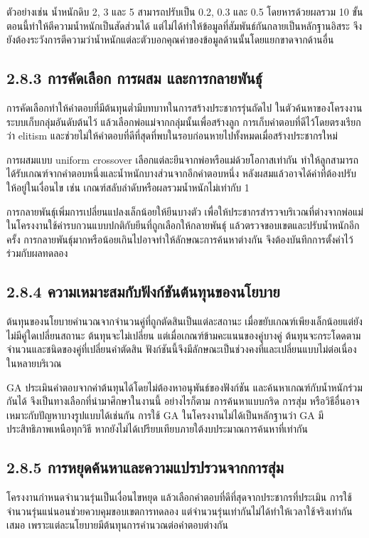 ตัวอย่างเช่น น้ำหนักดิบ 2, 3 และ 5 สามารถปรับเป็น 0.2, 0.3 และ 0.5 โดยหารด้วยผลรวม 10 ขั้นตอนนี้ทำให้ตีความน้ำหนักเป็นสัดส่วนได้ แต่ไม่ได้ทำให้ข้อมูลที่สัมพันธ์กันกลายเป็นหลักฐานอิสระ จึงยังต้องระวังการตีความว่าน้ำหนักแต่ละตัวบอกคุณค่าของข้อมูลด้านนั้นโดยแยกขาดจากด้านอื่น

\subsection*{2.8.3 การคัดเลือก การผสม และการกลายพันธุ์}
การคัดเลือกทำให้คำตอบที่มีต้นทุนต่ำมีบทบาทในการสร้างประชากรรุ่นถัดไป ในตัวค้นหาของโครงงาน ระบบเก็บกลุ่มอันดับต้นไว้ แล้วเลือกพ่อแม่จากกลุ่มนั้นเพื่อสร้างลูก การเก็บคำตอบที่ดีไว้โดยตรงเรียกว่า elitism และช่วยไม่ให้คำตอบที่ดีที่สุดที่พบในรอบก่อนหายไปทั้งหมดเมื่อสร้างประชากรใหม่

การผสมแบบ uniform crossover เลือกแต่ละยีนจากพ่อหรือแม่ด้วยโอกาสเท่ากัน ทำให้ลูกสามารถได้รับเกณฑ์จากคำตอบหนึ่งและน้ำหนักบางส่วนจากอีกคำตอบหนึ่ง หลังผสมแล้วอาจได้ค่าที่ต้องปรับให้อยู่ในเงื่อนไข เช่น เกณฑ์สลับลำดับหรือผลรวมน้ำหนักไม่เท่ากับ 1

การกลายพันธุ์เพิ่มการเปลี่ยนแปลงเล็กน้อยให้ยีนบางตัว เพื่อให้ประชากรสำรวจบริเวณที่ต่างจากพ่อแม่ ในโครงงานใช้ค่ารบกวนแบบปกติกับยีนที่ถูกเลือกให้กลายพันธุ์ แล้วตรวจขอบเขตและปรับน้ำหนักอีกครั้ง การกลายพันธุ์มากหรือน้อยเกินไปอาจทำให้ลักษณะการค้นหาต่างกัน จึงต้องบันทึกการตั้งค่าไว้ร่วมกับผลทดลอง

\subsection*{2.8.4 ความเหมาะสมกับฟังก์ชันต้นทุนของนโยบาย}
ต้นทุนของนโยบายคำนวณจากจำนวนคู่ที่ถูกตัดสินเป็นแต่ละสถานะ เมื่อขยับเกณฑ์เพียงเล็กน้อยแต่ยังไม่มีคู่ใดเปลี่ยนสถานะ ต้นทุนจะไม่เปลี่ยน แต่เมื่อเกณฑ์ข้ามคะแนนของคู่บางคู่ ต้นทุนจะกระโดดตามจำนวนและชนิดของคู่ที่เปลี่ยนคำตัดสิน ฟังก์ชันนี้จึงมีลักษณะเป็นช่วงคงที่และเปลี่ยนแบบไม่ต่อเนื่องในหลายบริเวณ

GA ประเมินคำตอบจากค่าต้นทุนได้โดยไม่ต้องหาอนุพันธ์ของฟังก์ชัน และค้นหาเกณฑ์กับน้ำหนักร่วมกันได้ จึงเป็นทางเลือกที่นำมาศึกษาในงานนี้ อย่างไรก็ตาม การค้นหาแบบกริด การสุ่ม หรือวิธีอื่นอาจเหมาะกับปัญหาบางรูปแบบได้เช่นกัน การใช้ GA ในโครงงานไม่ได้เป็นหลักฐานว่า GA มีประสิทธิภาพเหนือทุกวิธี หากยังไม่ได้เปรียบเทียบภายใต้งบประมาณการค้นหาที่เท่ากัน

\subsection*{2.8.5 การหยุดค้นหาและความแปรปรวนจากการสุ่ม}
โครงงานกำหนดจำนวนรุ่นเป็นเงื่อนไขหยุด แล้วเลือกคำตอบที่ดีที่สุดจากประชากรที่ประเมิน การใช้จำนวนรุ่นแน่นอนช่วยควบคุมขอบเขตการทดลอง แต่จำนวนรุ่นเท่ากันไม่ได้ทำให้เวลาใช้จริงเท่ากันเสมอ เพราะแต่ละนโยบายมีต้นทุนการคำนวณต่อคำตอบต่างกัน

